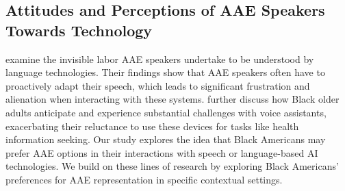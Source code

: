 
\subsection*{Attitudes and Perceptions of AAE Speakers Towards Technology} %
\citet{Cunningham2024Impacts} examine the invisible labor AAE speakers undertake to be understood by language technologies. Their findings show that AAE speakers often have to proactively adapt their speech, which leads to significant frustration and alienation when interacting with these systems.
\citet{harrington} further discuss how Black older adults anticipate and experience substantial challenges with voice assistants, exacerbating their reluctance to use these devices for tasks like health information seeking. Our study explores the idea that Black Americans may prefer AAE options in their interactions with speech or language-based AI technologies. We build on these lines of research by exploring Black Americans' preferences for AAE representation in specific contextual settings.



